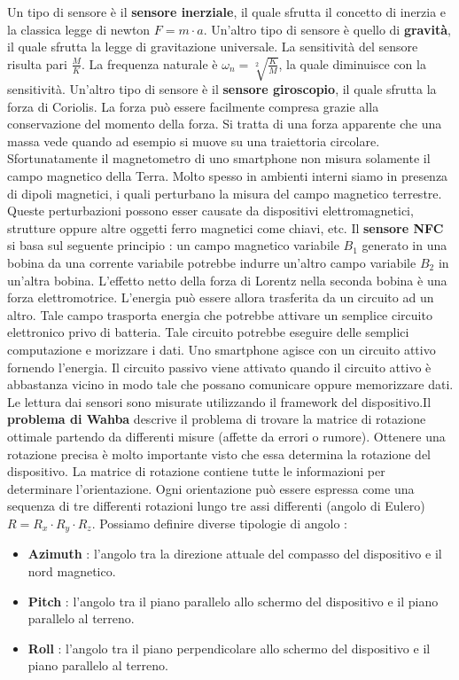 \documentclass[12pt]{report}
\begin{document}
Un tipo di sensore è il \textbf{sensore inerziale}, il quale sfrutta il concetto di inerzia e la classica legge di newton $F = m\cdot a$. Un'altro tipo di sensore è quello di \textbf{gravità}, il quale sfrutta la legge di gravitazione universale. La sensitività del sensore risulta pari $\frac{M}{K}$. La frequenza naturale è $\omega_n = \sqrt[2]{\frac{K}{M}}$, la quale diminuisce con la sensitività. Un'altro tipo di sensore è il \textbf{sensore giroscopio}, il quale sfrutta la forza di Coriolis. La forza può essere facilmente compresa grazie alla conservazione del momento della forza. Si tratta di una forza apparente che una massa vede quando ad esempio si muove su una traiettoria circolare. Sfortunatamente il magnetometro di uno smartphone non misura solamente il campo magnetico della Terra. Molto spesso in ambienti interni siamo in presenza di dipoli magnetici, i quali perturbano la misura del campo magnetico terrestre. Queste perturbazioni possono esser causate da dispositivi elettromagnetici, strutture oppure altre oggetti ferro magnetici come chiavi, etc. Il \textbf{sensore NFC} si basa sul seguente principio : un campo magnetico variabile $B_1$ generato in una bobina da una corrente variabile potrebbe indurre un'altro campo variabile $B_2$ in un'altra bobina. L'effetto netto della forza di Lorentz nella seconda bobina è una forza elettromotrice. L'energia può essere allora trasferita da un circuito ad un altro. Tale campo trasporta energia che potrebbe attivare un semplice circuito elettronico privo di batteria. Tale circuito potrebbe eseguire delle semplici computazione e morizzare i dati. Uno smartphone agisce con un circuito attivo fornendo l'energia. Il circuito passivo viene attivato quando il circuito attivo è abbastanza vicino in modo tale che possano comunicare oppure memorizzare dati. Le lettura dai sensori sono misurate utilizzando il framework del dispositivo.Il \textbf{problema di Wahba} descrive il problema di trovare la matrice di rotazione ottimale partendo da differenti misure (affette da errori o rumore). Ottenere una rotazione precisa è molto importante visto che essa determina la rotazione del dispositivo. La matrice di rotazione contiene tutte le informazioni per determinare l'orientazione. Ogni orientazione può essere espressa come una sequenza di tre differenti rotazioni lungo tre assi differenti (angolo di Eulero) $R = R_x \cdot R_y \cdot R_z$. Possiamo definire diverse tipologie di angolo :
\begin{itemize}
\item \textbf{Azimuth} : l'angolo tra la direzione attuale del compasso del dispositivo e il nord magnetico.
\item \textbf{Pitch} : l'angolo tra il piano parallelo allo schermo del dispositivo e il piano parallelo al terreno.
\item \textbf{Roll} : l'angolo tra il piano perpendicolare allo schermo del dispositivo e il piano parallelo al terreno.
\end{itemize}
\end{document}
